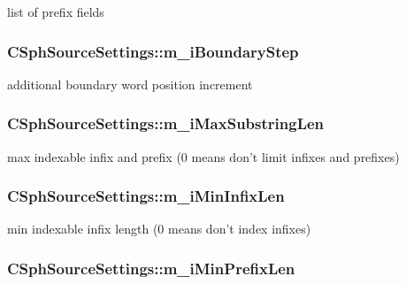 list of prefix fields 

\hypertarget{structCSphSourceSettings_ab91af5eb3f973f662ad5665e17cb3e1f}{
\subsubsection[{m\-\_\-i\-Boundary\-Step}]{ C\-Sph\-Source\-Settings\-::m\-\_\-i\-Boundary\-Step}}\label{structCSphSourceSettings_ab91af5eb3f973f662ad5665e17cb3e1f}


additional boundary word position increment 

\hypertarget{structCSphSourceSettings_ad7fa82ac9f78dc9760660f99e23f8533}{
\subsubsection[{m\-\_\-i\-Max\-Substring\-Len}]{ C\-Sph\-Source\-Settings\-::m\-\_\-i\-Max\-Substring\-Len}}\label{structCSphSourceSettings_ad7fa82ac9f78dc9760660f99e23f8533}


max indexable infix and prefix (0 means don't limit infixes and prefixes) 

\hypertarget{structCSphSourceSettings_ac0d1b57d5e2287bd0e17ca1dc3e4f369}{
\subsubsection[{m\-\_\-i\-Min\-Infix\-Len}]{ C\-Sph\-Source\-Settings\-::m\-\_\-i\-Min\-Infix\-Len}}\label{structCSphSourceSettings_ac0d1b57d5e2287bd0e17ca1dc3e4f369}


min indexable infix length (0 means don't index infixes) 

\hypertarget{structCSphSourceSettings_a7256ccbc374d3a218e62e5eca67d196e}{
\subsubsection[{m\-\_\-i\-Min\-Prefix\-Len}]{ C\-Sph\-Source\-Settings\-::m\-\_\-i\-Min\-Prefix\-Len}}\label{structCSphSourceSettings_a7256ccbc374d3a218e62e5eca67d196e}


